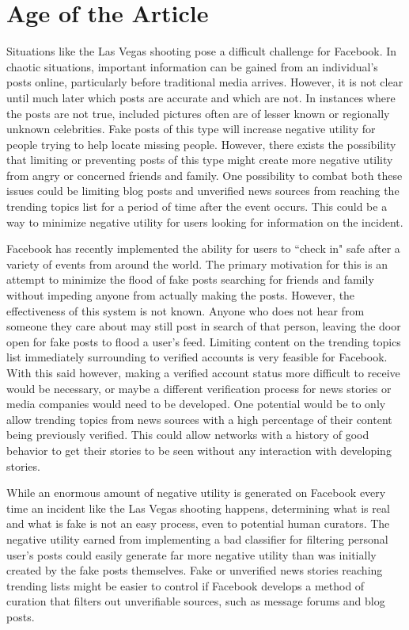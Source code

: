 \documentclass[12pt]{article}
\begin{document}
\section{Age of the Article}

Situations like the Las Vegas shooting pose a difficult challenge for Facebook. In chaotic situations, important information can be gained from an individual's posts online, particularly before traditional media arrives. However, it is not clear until much later which posts are accurate and which are not. In instances where the posts are not true, included pictures often are of lesser known or regionally unknown celebrities. Fake posts of this type will increase negative utility for people trying to help locate missing people. However, there exists the possibility that limiting or preventing posts of this type might create more negative utility from angry or concerned friends and family. One possibility to combat both these issues could be limiting blog posts and unverified news sources from reaching the trending topics list for a period of time after the event occurs. This could be a way to minimize negative utility for users looking for information on the incident.

Facebook has recently implemented the ability for users to ``check in" safe after a variety of events from around the world. The primary motivation for this is an attempt to minimize the flood of fake posts searching for friends and family without impeding anyone from actually making the posts. However, the effectiveness of this system is not known. Anyone who does not hear from someone they care about may still post in search of that person, leaving the door open for fake posts to flood a user's feed. Limiting content on the trending topics list immediately surrounding to verified accounts is very feasible for Facebook. With this said however, making a verified account status more difficult to receive would be necessary, or maybe a different verification process for news stories or media companies would need to be developed. One potential would be to only allow trending topics from news sources with a high percentage of their content being previously verified. This could allow networks with a history of good behavior to get their stories to be seen without any interaction with developing stories.

While an enormous amount of negative utility is generated on Facebook every time an incident like the Las Vegas shooting happens, determining what is real and what is fake is not an easy process, even to potential human curators. The negative utility earned from implementing a bad classifier for filtering personal user's posts could easily generate far more negative utility than was initially created by the fake posts themselves. Fake or unverified news stories reaching trending lists might be easier to control if Facebook develops a method of curation that filters out unverifiable sources, such as message forums and blog posts. 
\end{document}
